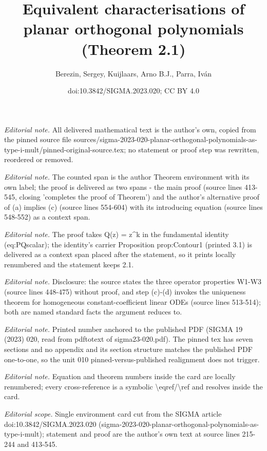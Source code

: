 \documentclass[10pt,a4paper]{article}
\title{Equivalent characterisations of planar orthogonal polynomials (Theorem 2.1)}
\author{Berezin, Sergey, Kuijlaars, Arno B.J., Parra, Iván}
\date{doi:10.3842/SIGMA.2023.020; CC BY 4.0}
\numberwithin{equation}{section}
\begin{document}
\maketitle
\setcounter{section}{2}
\setcounter{Theorem}{0}
\noindent\textit{Editorial note.} All delivered mathematical text is the author's own, copied from the pinned source file sources/sigma-2023-020-planar-orthogonal-polynomials-as-type-i-mult/pinned-original-source.tex; no statement or proof step was rewritten, reordered or removed.\par\medskip
\noindent\textit{Editorial note.} The counted span is the author Theorem environment with its own label; the proof is delivered as two spans - the main proof (source lines 413-545, closing 'completes the proof of Theorem') and the author's alternative proof of (a) implies (c) (source lines 554-604) with its introducing equation (source lines 548-552) as a context span.\par\medskip
\noindent\textit{Editorial note.} The proof takes Q(z) = z\textasciicircum{}k in the fundamental identity (eq:PQscalar); the identity's carrier Proposition prop:Contour1 (printed 3.1) is delivered as a context span placed after the statement, so it prints locally renumbered and the statement keeps 2.1.\par\medskip
\noindent\textit{Editorial note.} Disclosure: the source states the three operator properties W1-W3 (source lines 448-475) without proof, and step (c)-(d) invokes the uniqueness theorem for homogeneous constant-coefficient linear ODEs (source lines 513-514); both are named standard facts the argument reduces to.\par\medskip
\noindent\textit{Editorial note.} Printed number anchored to the published PDF (SIGMA 19 (2023) 020, read from pdftotext of sigma23-020.pdf). The pinned tex has seven sections and no appendix and its section structure matches the published PDF one-to-one, so the unit 010 pinned-versus-published realignment does not trigger.\par\medskip
\noindent\textit{Editorial note.} Equation and theorem numbers inside the card are locally renumbered; every cross-reference is a symbolic \textbackslash{}eqref/\textbackslash{}ref and resolves inside the card.\par\medskip
\noindent\textit{Editorial scope.} Single environment card cut from the SIGMA article doi:10.3842/SIGMA.2023.020 (sigma-2023-020-planar-orthogonal-polynomials-as-type-i-mult); statement and proof are the author's own text at source lines 215-244 and 413-545.\par\medskip
\end{document}
